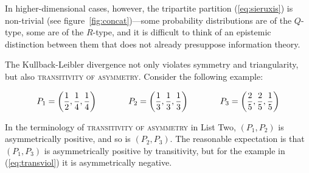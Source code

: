 \documentclass[11pt]{article}
\begin{document}
In higher-dimensional cases, however, the tripartite partition
(\ref{eq:sieruxis}) is non-trivial (see
figure~\ref{fig:concat})---some probability distributions are of the
$Q$-type, some are of the $R$-type, and it is difficult to think of an
epistemic distinction between them that does not already presuppose
information theory.

The Kullback-Leibler divergence not only violates symmetry and
triangularity, but also \textsc{transitivity of asymmetry}. Consider
the following example:

\begin{equation}
  \label{eq:transviol}
  P_{1}=\left(\frac{1}{2},\frac{1}{4},\frac{1}{4}\right)  \hspace{.5in}
  P_{2}=\left(\frac{1}{3},\frac{1}{3},\frac{1}{3}\right) \hspace{.5in}
  P_{3}=\left(\frac{2}{5},\frac{2}{5},\frac{1}{5}\right)
\end{equation}

In the terminology of \textsc{transitivity of asymmetry} in List Two,
$(P_{1},P_{2})$ is asymmetrically positive, and so is $(P_{2},P_{3})$.
The reasonable expectation is that $(P_{1},P_{3})$ is asymmetrically
positive by transitivity, but for the example in (\ref{eq:transviol})
it is asymmetrically negative.


 

\end{document}
